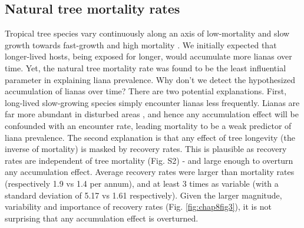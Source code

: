 \documentclass[b5paper,justified]{tufte-book} %
\begin{document}
\begin{fullwidth}
\subsection{Natural tree mortality rates}
Tropical tree species vary continuously along an axis of low-mortality and slow growth towards fast-growth and high mortality \citep{Gilbert2006, Wright2010}. We initially expected that longer-lived hosts, being exposed for longer, would accumulate more lianas over time. Yet, the natural tree mortality rate was found to be the least influential parameter in explaining liana prevalence. Why don't we detect the hypothesized accumulation of lianas over time? There are two potential explanations. First, long-lived slow-growing species simply encounter lianas less frequently.  Lianas are far more abundant in disturbed areas \citep{Putz1984a, Ledo2014},  and hence any accumulation effect will be confounded with an encounter rate, leading mortality to be a weak predictor of liana prevalence. The second explanation is that any effect of tree longevity (the inverse of mortality) is masked by recovery rates. This is plausible as recovery rates are independent of tree mortality (Fig. S2) - and large enough to overturn any accumulation effect. Average recovery rates were larger than mortality rates (respectively 1.9 vs 1.4 per annum), and at least 3 times as variable (with a standard deviation of 5.17 vs 1.61 respectively). Given the larger magnitude, variability and importance of recovery rates (Fig. \ref{fig:chap8fig3}), it is not surprising that any accumulation effect is overturned. 


\end{fullwidth}
\end{document}
